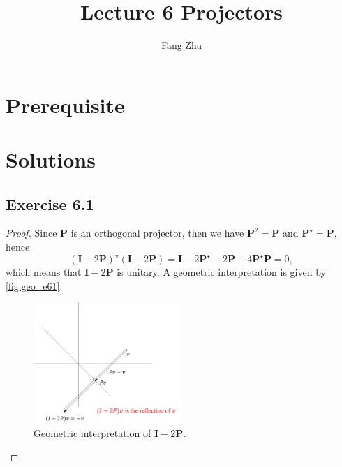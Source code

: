 \documentclass{article}
\author{Fang Zhu}
\title{Lecture 6 Projectors}
\begin{document}
	\maketitle
	
\section{Prerequisite}


\section{Solutions}
\subsection{Exercise 6.1}
\begin{proof}
    Since $\bm{P}$ is an orthogonal projector, then we have $\bm{P}^2 = \bm{P}$ and $\bm{P}^{\star} = \bm{P}$, hence 
    \begin{equation}
        (\bm{I} - 2\bm{P})^{\star}  (\bm{I} - 2\bm{P}) = \bm{I} - 2\bm{P}^\star - 2 \bm{P} + 4 \bm{P}^\star \bm{P} = 0,
    \end{equation}
    which means that $\bm{I} - 2 \bm{P}$ is unitary. A geometric interpretation is given by \autoref{fig:geo_e61}.
    \begin{figure}[htpb]
        \centering
        \includegraphics[width=0.5\textwidth]{e61.png}
        \caption{Geometric interpretation of $\bm{I} - 2\bm{P}$.}
        \label{fig:geo_e61}
    \end{figure}
\end{proof}
\end{document}
